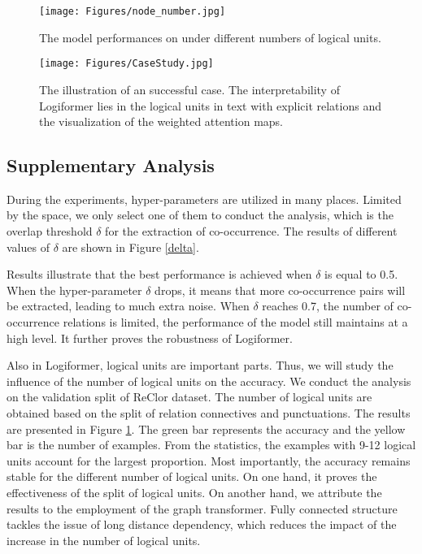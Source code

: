 \documentclass[sigconf]{acmart}
\begin{document}
\begin{figure}[t]
	\large
	\centering
	\texttt{[image: Figures/node\_number.jpg]}
	\vspace{-0.3cm}
	\caption{The model performances on under different numbers of logical units.}
	\label{nodenum}
	\vspace{-0.5cm}
\end{figure}

\begin{figure*}[t]
	\large
	\centering
	\texttt{[image: Figures/CaseStudy.jpg]}
	\caption{The illustration of an successful case. The interpretability of Logiformer lies in the logical units in text with explicit relations and the visualization of the weighted attention maps.}
	\label{casestudy}
\end{figure*}

\vspace{-0.3cm}
\subsection{Supplementary Analysis}
During the experiments, hyper-parameters are utilized in many places. Limited by the space, we only select one of them to conduct the analysis, which is the overlap threshold $\delta$ for the extraction of co-occurrence. The results of different values of $\delta$ are shown in Figure \ref{delta}.

Results illustrate that the best performance is achieved when $\delta$ is equal to 0.5. When the hyper-parameter $\delta$ drops, it means that more co-occurrence pairs will be extracted, leading to much extra noise. When $\delta$ reaches 0.7, the number of co-occurrence relations is limited, the performance of the model still maintains at a high level. It further proves the robustness of Logiformer.

Also in Logiformer, logical units are important parts. Thus, we will study the influence of the number of logical units on the accuracy. We conduct the analysis on the validation split of ReClor dataset. The number of logical units are obtained based on the split of relation connectives and punctuations. The results are presented in Figure \ref{nodenum}. The green bar represents the accuracy and the yellow bar is the number of examples. From the statistics, the examples with 9-12 logical units account for the largest proportion. Most importantly, the accuracy remains stable for the different number of logical units. On one hand, it proves the effectiveness of the split of logical units. On another hand, we attribute the results to the employment of the graph transformer. Fully connected structure tackles the issue of long distance dependency, which reduces the impact of the increase in the number of logical units.
\end{document}
